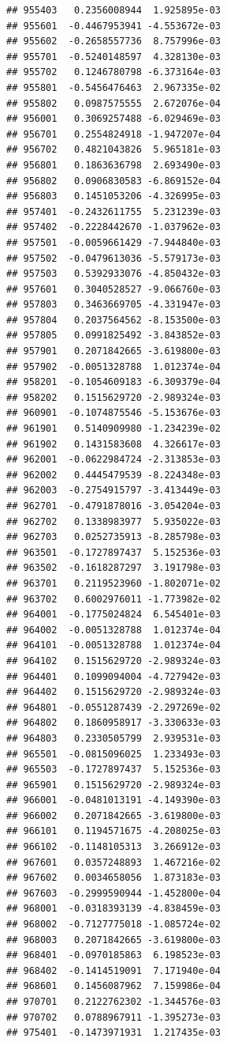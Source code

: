 \begin{frame}[fragile]
\begin{verbatim}
## 955403   0.2356008944  1.925895e-03
## 955601  -0.4467953941 -4.553672e-03
## 955602  -0.2658557736  8.757996e-03
## 955701  -0.5240148597  4.328130e-03
## 955702   0.1246780798 -6.373164e-03
## 955801  -0.5456476463  2.967335e-02
## 955802   0.0987575555  2.672076e-04
## 956001   0.3069257488 -6.029469e-03
## 956701   0.2554824918 -1.947207e-04
## 956702   0.4821043826  5.965181e-03
## 956801   0.1863636798  2.693490e-03
## 956802   0.0906830583 -6.869152e-04
## 956803   0.1451053206 -4.326995e-03
## 957401  -0.2432611755  5.231239e-03
## 957402  -0.2228442670 -1.037962e-03
## 957501  -0.0059661429 -7.944840e-03
## 957502  -0.0479613036 -5.579173e-03
## 957503   0.5392933076 -4.850432e-03
## 957601   0.3040528527 -9.066760e-03
## 957803   0.3463669705 -4.331947e-03
## 957804   0.2037564562 -8.153500e-03
## 957805   0.0991825492 -3.843852e-03
## 957901   0.2071842665 -3.619800e-03
## 957902  -0.0051328788  1.012374e-04
## 958201  -0.1054609183 -6.309379e-04
## 958202   0.1515629720 -2.989324e-03
## 960901  -0.1074875546 -5.153676e-03
## 961901   0.5140909980 -1.234239e-02
## 961902   0.1431583608  4.326617e-03
## 962001  -0.0622984724 -2.313853e-03
## 962002   0.4445479539 -8.224348e-03
## 962003  -0.2754915797 -3.413449e-03
## 962701  -0.4791878016 -3.054204e-03
## 962702   0.1338983977  5.935022e-03
## 962703   0.0252735913 -8.285798e-03
## 963501  -0.1727897437  5.152536e-03
## 963502  -0.1618287297  3.191798e-03
## 963701   0.2119523960 -1.802071e-02
## 963702   0.6002976011 -1.773982e-02
## 964001  -0.1775024824  6.545401e-03
## 964002  -0.0051328788  1.012374e-04
## 964101  -0.0051328788  1.012374e-04
## 964102   0.1515629720 -2.989324e-03
## 964401   0.1099094004 -4.727942e-03
## 964402   0.1515629720 -2.989324e-03
## 964801  -0.0551287439 -2.297269e-02
## 964802   0.1860958917 -3.330633e-03
## 964803   0.2330505799  2.939531e-03
## 965501  -0.0815096025  1.233493e-03
## 965503  -0.1727897437  5.152536e-03
## 965901   0.1515629720 -2.989324e-03
## 966001  -0.0481013191 -4.149390e-03
## 966002   0.2071842665 -3.619800e-03
## 966101   0.1194571675 -4.208025e-03
## 966102  -0.1148105313  3.266912e-03
## 967601   0.0357248893  1.467216e-02
## 967602   0.0034658056  1.873183e-03
## 967603  -0.2999590944 -1.452800e-04
## 968001  -0.0318393139 -4.838459e-03
## 968002  -0.7127775018 -1.085724e-02
## 968003   0.2071842665 -3.619800e-03
## 968401  -0.0970185863  6.198523e-03
## 968402  -0.1414519091  7.171940e-04
## 968601   0.1456087962  7.159986e-04
## 970701   0.2122762302 -1.344576e-03
## 970702   0.0788967911 -1.395273e-03
## 975401  -0.1473971931  1.217435e-03

\end{verbatim}
\end{frame}

